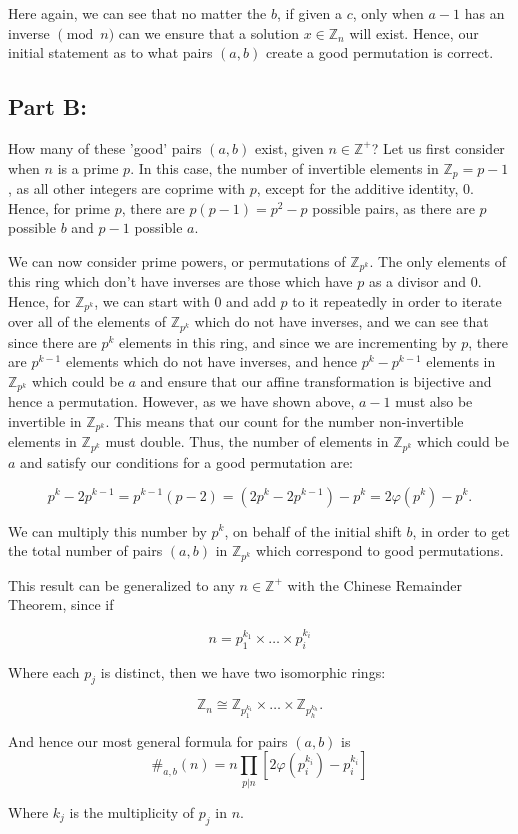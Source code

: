 \documentclass[12pt]{article}
\theoremstyle{moo}
\def\zz{{\mathbb Z}}
\begin{document}
Here again, we can see that no matter the $b$, if given a $c$, only when $a-1$ has an inverse $\pmod{n}$ can we ensure that a solution $x \in \zz_n$ will exist. Hence, our initial statement as to what pairs $\left(a,b\right)$ create a good permutation is correct.

\subsection*{Part B:}
How many of these 'good' pairs $\left(a,b\right)$ exist, given $n \in \zz^{+}$? Let us first consider when $n$ is a prime $p$. In this case, the number of invertible elements in $\zz_p = p-1$, as all other integers are coprime with $p$, except for the additive identity, $0$. Hence, for prime $p$, there are $p\left(p-1\right) = p^2 - p$ possible pairs, as there are $p$ possible $b$ and $p-1$ possible $a$. 

We can now consider prime powers, or permutations of $\zz_{p^k}$. The only elements of this ring which don't have inverses are those which have $p$ as a divisor and $0$. Hence, for $\zz_{p^k}$, we can start with $0$ and add $p$ to it repeatedly in order to iterate over all of the elements of $\zz_{p^k}$ which do not have inverses, and we can see that since there are $p^k$ elements in this ring, and since we are incrementing by $p$, there are $p^{k-1}$ elements which do not have inverses, and hence $p^k - p^{k-1}$ elements in $\zz_{p^k}$ which could be $a$ and ensure that our affine transformation is bijective and hence a permutation. However, as we have shown above, $a-1$ must also be invertible in $\zz_{p^k}$. This means that our count for the number non-invertible elements in $\zz_{p^k}$ must double. Thus, the number of elements in $\zz_{p^k}$ which could be $a$ and satisfy our conditions for a good permutation are:

\[
p^k - 2p^{k-1} = p^{k-1} \left(p-2\right) = \left(2p^k - 2p^{k-1}\right) - p^k = 2\varphi(p^k) - p^k.
\]

We can multiply this number by $p^k$, on behalf of the initial shift $b$, in order to get the total number of pairs $\left( a,b \right)$ in $\zz_{p^k}$ which correspond to good permutations.

This result can be generalized to any $n \in \zz^{+}$ with the Chinese Remainder Theorem, since if

\[
n = p_{1}^{k_1} \times \dots \times p_{i}^{k_i}
\]

Where each $p_j$ is distinct, then we have two isomorphic rings:

\[
\zz_n \cong \zz_{p_{1}^{k_1}} \times \dots \times \zz_{p_{h}^{k_h}}.
\]

And hence our most general formula for pairs $\left(a,b\right)$ is 
\[
\#_{a,b}(n) = n \prod_{p|n} \left[ 2\varphi(p_i^{k_i}) - p_i^{k_i} \right]
\]

Where $k_j$ is the multiplicity of $p_j$ in $n$.
\end{document}

